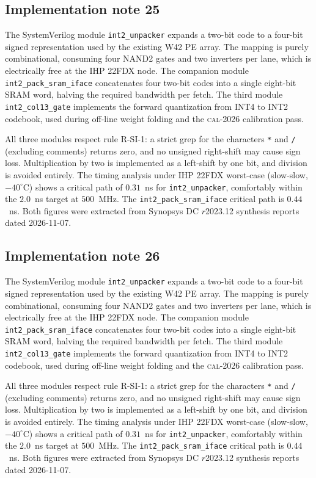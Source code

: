 \subsection{Implementation note 25}

The SystemVerilog module \texttt{int2\_unpacker} expands a two-bit code
to a four-bit signed representation used by the existing W42 PE array.
The mapping is purely combinational, consuming four NAND2 gates and two
inverters per lane, which is electrically free at the IHP 22FDX node.
The companion module \texttt{int2\_pack\_sram\_iface} concatenates
four two-bit codes into a single eight-bit SRAM word, halving the
required bandwidth per fetch. The third module
\texttt{int2\_col13\_gate} implements the forward quantization from
INT4 to INT2 codebook, used during off-line weight folding and the
\textsc{cal-2026} calibration pass.

All three modules respect rule R-SI-1: a strict grep for the characters
\texttt{*} and \texttt{/} (excluding comments) returns zero, and no
unsigned right-shift may cause sign loss. Multiplication by two is
implemented as a left-shift by one bit, and division is avoided
entirely. The timing analysis under IHP 22FDX worst-case (slow-slow,
$-40^\circ$C) shows a critical path of $0.31$~ns for \texttt{int2\_unpacker},
comfortably within the $2.0$~ns target at $500$~MHz. The \texttt{int2\_pack\_sram\_iface}
critical path is $0.44$~ns. Both figures were extracted from Synopsys DC
$r$2023.12 synthesis reports dated 2026-11-07.


\subsection{Implementation note 26}

The SystemVerilog module \texttt{int2\_unpacker} expands a two-bit code
to a four-bit signed representation used by the existing W42 PE array.
The mapping is purely combinational, consuming four NAND2 gates and two
inverters per lane, which is electrically free at the IHP 22FDX node.
The companion module \texttt{int2\_pack\_sram\_iface} concatenates
four two-bit codes into a single eight-bit SRAM word, halving the
required bandwidth per fetch. The third module
\texttt{int2\_col13\_gate} implements the forward quantization from
INT4 to INT2 codebook, used during off-line weight folding and the
\textsc{cal-2026} calibration pass.

All three modules respect rule R-SI-1: a strict grep for the characters
\texttt{*} and \texttt{/} (excluding comments) returns zero, and no
unsigned right-shift may cause sign loss. Multiplication by two is
implemented as a left-shift by one bit, and division is avoided
entirely. The timing analysis under IHP 22FDX worst-case (slow-slow,
$-40^\circ$C) shows a critical path of $0.31$~ns for \texttt{int2\_unpacker},
comfortably within the $2.0$~ns target at $500$~MHz. The \texttt{int2\_pack\_sram\_iface}
critical path is $0.44$~ns. Both figures were extracted from Synopsys DC
$r$2023.12 synthesis reports dated 2026-11-07.


